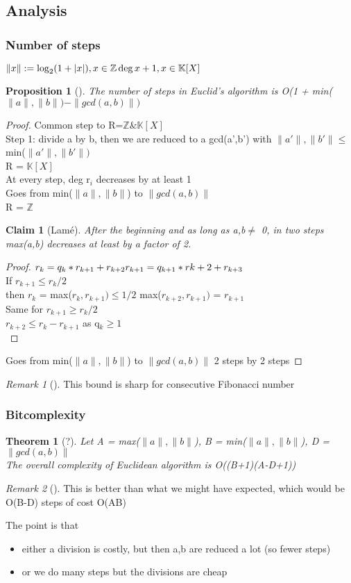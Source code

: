 \documentclass{article}
\newtheorem{proposition}{Proposition}
\newtheorem{claim}{Claim}
\newtheorem{theorem}{Theorem}
\theoremstyle{definition}
\theoremstyle{remark}
\newtheorem*{remark}{Remark}
\newcommand{\Thm}[3]{\begin{theorem}[#1]\label{#2}#3\end{theorem}}
\newcommand{\Prop}[3]{\begin{proposition}[#1]\label{#2}#3\end{proposition}}
\newcommand{\Rem}[3]{\begin{remark}[#1]\label{#2}#3\end{remark}}
\newcommand{\Proof}[1]{\begin{proof}#1\end{proof}}
\newcommand{\Z}{\mathbb{Z}}
\newcommand{\K}{\mathbb{K}}
\begin{document}
\subsection{Analysis}
\subsubsection{Number of steps}
$\| x \| := \log_2(1+|x|),x\in\Z\\
 \deg x + 1, x\in\K[X]$

\Prop{}{}{The number of steps in Euclid's algorithm is O(1 + min($\| a \|,\| b \|) - \| gcd(a,b)\|)$}
\Proof{Common step to R=$\Z \& \K[X]$\\
	Step 1: divide a by b, then we are reduced to a gcd(a',b') with $\| a' \|,\| b' \| \leq$ min($\| a' \|,\| b' \|)$\\
	R = $\K[X]$\\
	At every step, deg r$_i$ decreases by at least 1\\
	Goes from min($\| a \|,\| b \|$) to $\| gcd(a,b)\|$\\
	R = $\Z$\\
	\begin{claim}[Lamé]
		After the beginning and as long as a,b$\neq$ 0, in two steps max(a,b) decreases at least by a factor of 2.
	\end{claim}
	\Proof{$r_k = q_k*r_{k+1}+r_{k+2}\\
		r_{k+1} = q_{k+1}*r{k+2}+r_{k+3}$\\
		If $r_{k+1} \leq r_k/2$\\
		then $r_k$ = max($r_k,r_{k+1}) \leq 1/2$ max($r_{k+2},r_{k+1})$ = $r_{k+1}$\\
		Same for $r_{k+1} \geq r_k/2$\\
		$r_{k+2} \leq r_k - r_{k+1}$ as q$_k \geq 1$\\}
	Goes from min($\| a \|,\| b \|$) to $\| gcd(a,b)\|$ 2 steps by 2 steps
}

\Rem{}{}{This bound is sharp for consecutive Fibonacci number}

\subsubsection{Bitcomplexity}
\Thm{?}{}{Let A = max($\| a \|,\| b \|$), B = min($\| a \|,\| b \|$), D = $\| gcd(a,b)\|$\\
	The overall complexity of Euclidean algorithm is O((B+1)(A-D+1))}

\Rem{}{}{This is better than what we might have expected, which would be O(B-D) steps of cost O(AB)}
The point is that \begin{itemize}
	\item either a division is costly, but then a,b are reduced a lot (so fewer steps)
	\item or we do many steps but the divisions are cheap
\end{itemize}
\end{document}
